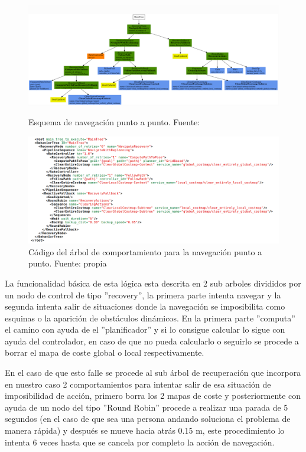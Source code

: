 \begin{figure}[htbp]
  \centering
  \begin{minipage}[b]{0.7\textwidth}
    \centering
    \includegraphics[width=\textwidth]{images/bt_ToPose_wrec_rep.png}
    \caption{Esquema de navegación punto a punto. Fuente: \cite{nav2}}
    \label{fig:bt_ToPose}
  \end{minipage}
  \hfill
  \begin{minipage}[b]{0.7\textwidth}
    \centering
    \includegraphics[width=\textwidth]{images/arbol_punto_apunto.png}
    \caption{Código del árbol de comportamiento para la navegación punto a punto. Fuente: propia}
    \label{fig:bt_ToPose_script}
  \end{minipage}
\end{figure}

La funcionalidad básica de esta lógica esta descrita en 2 sub arboles divididos por un nodo de control de tipo ''recovery'', la primera parte intenta navegar 
y la segunda intenta salir de situaciones donde la navegación se imposibilita como esquinas o la aparición de obstáculos dinámicos. En la primera parte 
''computa'' el camino con ayuda de el ''planificador'' y si lo consigue calcular lo sigue con ayuda del controlador, en caso de que no pueda calcularlo o seguirlo 
se procede a borrar el mapa de coste global o local respectivamente.

En el caso de que esto falle se procede al sub árbol de recuperación que incorpora en nuestro caso 2 comportamientos para intentar salir de esa situación de imposibilidad de acción, 
primero borra los 2 mapas de coste y posteriormente con ayuda de un nodo del tipo ''Round Robin'' procede a realizar una parada de 5 segundos (en el caso de que sea una persona andando soluciona el problema de manera rápida) y 
después se mueve hacia atrás 0.15 m, este procedimiento lo intenta 6 veces hasta que se cancela por completo la acción de navegación.

